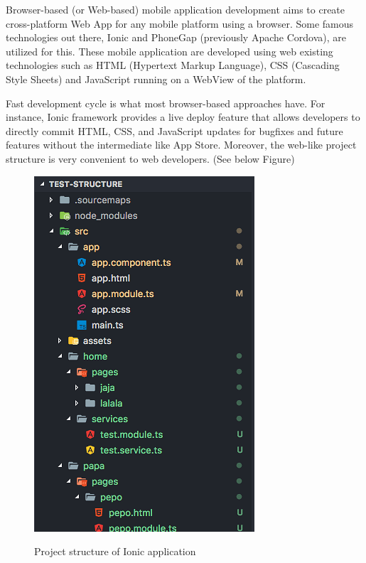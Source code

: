 \par{
    Browser-based (or Web-based) mobile application development aims to create cross-platform Web App for any mobile platform using a browser. Some famous technologies out there, Ionic and PhoneGap (previously Apache Cordova), are utilized for this.
    These mobile application are developed using web existing technologies such as HTML (Hypertext Markup Language), CSS (Cascading Style Sheets) and JavaScript running on a WebView of the platform.

    Fast development cycle is what most browser-based approaches have. For instance, Ionic framework provides a live deploy feature that allows developers to directly commit HTML, CSS, and JavaScript updates for bugfixes and future features without the intermediate like App Store. 
    Moreover, the web-like project structure is very convenient to web developers. (See below Figure)
    \begin{figure}[!ht]
        \centering
        \includegraphics[scale=0.7]{Picture/mobile/ionic_project_structure.png}
        \label{fig:structure_ionic_app}
        \caption{Project structure of Ionic application}
    \end{figure}

}
